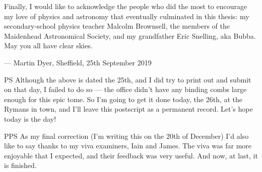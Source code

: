\begin{onehalfspace}
\newpage

\medskip

Finally, I would like to acknowledge the people who did the most to encourage my love of physics and astronomy that eventually culminated in this thesis: my secondary-school physics teacher Malcolm Brownsell, the members of the Maidenhead Astronomical Society, and my grandfather Eric Snelling, aka Bubba. May you all have clear skies.

\smallskip

\begin{flushright}
--- Martin Dyer, Sheffield, 25th September 2019
\end{flushright}

\medskip

PS Although the above is dated the 25th, and I did try to print out and submit on that day, I failed to do so --- the office didn't have any binding combs large enough for this epic tome. So I'm going to get it done today, the 26th, at the Rymans in town, and I'll leave this postscript as a permanent record. Let's hope today is the day!

\medskip

PPS As my final correction (I'm writing this on the 20th of December) I'd also like to say thanks to my viva examiners, Iain and James. The viva was far more enjoyable that I expected, and their feedback was very useful. And now, at last, it is finished.
\end{onehalfspace}
